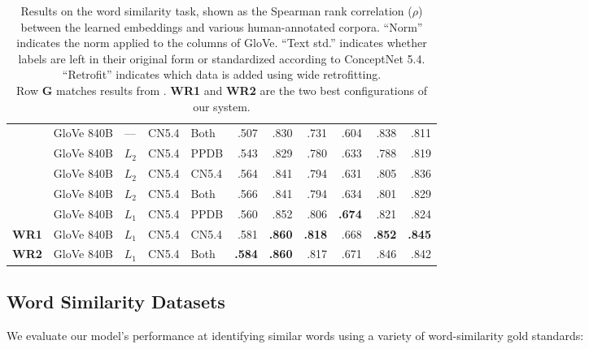 \documentclass[11pt]{article}
\begin{document}
\begin{table*}[t]
\begin{tabular}{lllllrrrrrr}
       &GloVe 840B   & ---   & CN5.4     & Both     &     .507 &     .830 &      .731 &      .604 &     .838 &     .811 \\
       &GloVe 840B   & $L_2$ & CN5.4     & PPDB     &     .543 &     .829 &      .780 &      .633 &     .788 &     .819 \\
       &GloVe 840B   & $L_2$ & CN5.4     & CN5.4    &     .564 &     .841 &      .794 &      .631 &     .805 &     .836 \\
       &GloVe 840B   & $L_2$ & CN5.4     & Both     &     .566 &     .841 &      .794 &      .634 &     .801 &     .829 \\
       &GloVe 840B   & $L_1$ & CN5.4     & PPDB     &     .560 &     .852 &      .806 & {\bf .674}&     .821 &     .824 \\
\bf WR1&GloVe 840B   & $L_1$ & CN5.4     & CN5.4    &     .581 &{\bf .860}& {\bf .818}&      .668 &{\bf .852}&{\bf .845}\\
\bf WR2&GloVe 840B   & $L_1$ & CN5.4     & Both     &{\bf .584}&{\bf .860}&      .817 &      .671 &     .846 &     .842 \\
\bottomrule
\end{tabular}

\caption{
    Results on the word similarity task, shown as the Spearman rank correlation
    ($\rho$) between the learned embeddings and various human-annotated corpora.
    ``Norm'' indicates the norm applied to the columns of GloVe.
    ``Text std.'' indicates whether labels are left in their original form or
    standardized according to ConceptNet 5.4. ``Retrofit'' indicates which data
    is added using wide retrofitting.\\
    Row {\bf G} matches results from .
    {\bf WR1} and {\bf WR2} are the two best configurations of our system.
}
\label{eval-bigtable}
\end{table*}

\subsection{Word Similarity Datasets}

We evaluate our model's performance at identifying similar words using a
variety of word-similarity gold standards:
\end{document}
